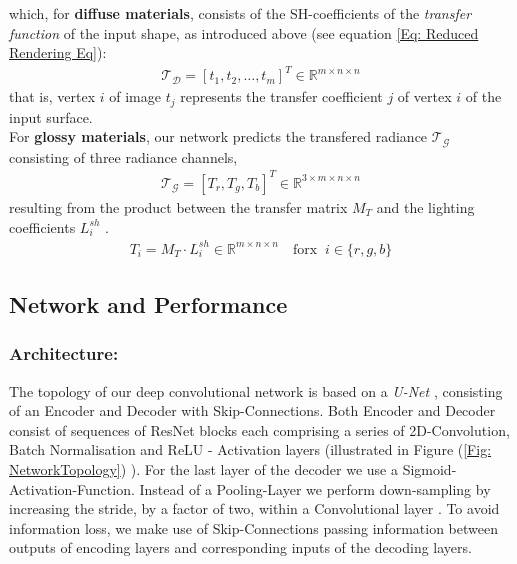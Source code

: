 which, for \textbf{diffuse materials}, consists of the SH-coefficients of the \textit{transfer function} of the input shape, as introduced above (see equation \ref{Eq: Reduced Rendering Eq}):
\begin{align*}
	\mathcal{T_D} = [ t_1, t_2, \dots, t_m ]^T \in \mathbb{R}^{m \times n \times n} 
\end{align*}
that is, vertex $i$ of image $t_j$ represents the transfer coefficient $j$ of vertex $i$ of the input surface.
\\
For \textbf{glossy materials}, our network predicts the transfered radiance $\mathcal{T_G}$ consisting of three radiance channels, 
\begin{align*}
\mathcal{T_G} = [T_r , T_g ,T_b]^T \in \mathbb{R}^{3 \times m \times n \times n} 
\end{align*}
resulting from the product between the transfer matrix $M_T$ and the lighting coefficients  $ L^{sh}_i$ \cite{sloan2002precomputed}. 
\begin{align*}
T_i= M_T \cdot L^{sh}_i   \in \mathbb{R}^{m \times n \times n}   \quad \text{forx }~  i \in \{r,g,b\} 
\end{align*}
\subsection{Network and Performance }
\subsubsection*{Architecture: \\} 
The topology of our deep convolutional network is based on a \textit{U-Net}  \cite{U-Net}, consisting of an Encoder and Decoder with Skip-Connections. Both Encoder and Decoder consist of sequences of ResNet blocks \cite{ResNet} each comprising a series of 2D-Convolution, Batch Normalisation and ReLU - Activation layers (illustrated in Figure (\ref{Fig: NetworkTopology}) ). For the last layer of the decoder we use a Sigmoid-Activation-Function. Instead of a Pooling-Layer we perform down-sampling by increasing the stride, by a factor of two, within a Convolutional layer \cite{StridingConv}. To avoid information loss,  we make use of Skip-Connections passing information between outputs of encoding layers and corresponding inputs of the decoding layers.

